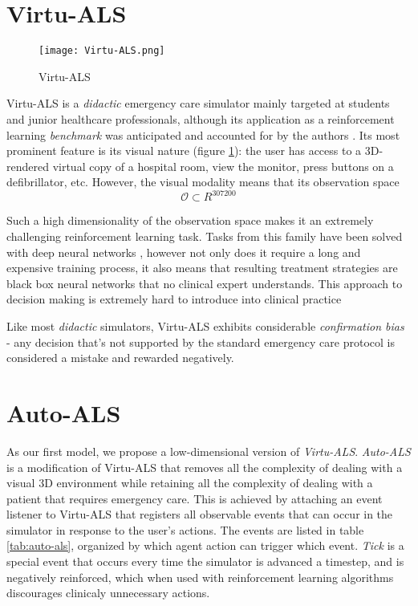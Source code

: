 \section{Virtu-ALS}
\label{sec:virtu-als}

\begin{figure}
    \centering
    \texttt{[image: Virtu-ALS.png]}
    \caption{Virtu-ALS}
    \label{fig:virtu-als}
\end{figure}

Virtu-ALS is a \emph{didactic} emergency care simulator mainly targeted at students and junior healthcare professionals, although its application as a reinforcement learning \emph{benchmark} was anticipated and accounted for by the authors \cite{briskAIEnhanceInteractive2018}.
Its most prominent feature is its visual nature (figure \ref{fig:virtu-als}): the user has access to a 3D-rendered virtual copy of a hospital room, view the monitor, press buttons on a defibrillator, etc.
However, the visual modality means that its observation space 
\begin{equation}
    \mathcal{O} \subset R^{307200}
\end{equation}

Such a high dimensionality of the observation space makes it an extremely challenging reinforcement learning task.
Tasks from this family have been solved with deep neural networks \cite{atari-rl}, however not only does it require a long and expensive training process, it also means that resulting treatment strategies are black box neural networks that no clinical expert understands.
This approach to decision making is extremely hard to introduce into clinical practice \cite{priceBigDataBlackbox2018,watsonClinicalApplicationsMachine2019}

Like most \emph{didactic} simulators, Virtu-ALS exhibits considerable \emph{confirmation bias} - any decision that's not supported by the standard emergency care protocol \cite{thimInitialAssessmentTreatment2012} is considered a mistake and rewarded negatively.

\newpage
\section{Auto-ALS}

As our first model, we propose a low-dimensional version of \emph{Virtu-ALS}.
\emph{Auto-ALS} is a modification of Virtu-ALS that removes all the complexity of dealing with a visual 3D environment while retaining all the complexity of dealing with a patient that requires emergency care.
This is achieved by attaching an event listener to Virtu-ALS that registers all observable events that can occur in the simulator in response to the user's actions.
The events are listed in table \ref{tab:auto-als}, organized by which agent action can trigger which event.
\emph{Tick} is a special event that occurs every time the simulator is advanced a timestep, and is negatively reinforced, which when used with reinforcement learning algorithms discourages clinicaly unnecessary actions.


